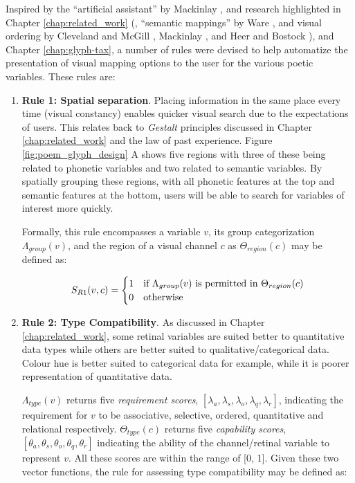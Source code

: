 Inspired by the ``artificial assistant'' by Mackinlay \etal \cite{mackinlay2007show}, and research highlighted in Chapter \ref{chap:related_work} (\eg, ``semantic mappings'' by Ware \cite{ware2010visual}, and visual ordering by Cleveland and McGill \cite{cleveland1984graphical}, Mackinlay \cite{mackinlay1986automating}, and Heer and Bostock \cite{heer2010crowdsourcing}), and Chapter \ref{chap:glyph-tax}, a number of rules were devised to help automatize the presentation of visual mapping options to the user for the various poetic variables.
These rules are:

\begin{enumerate}
\item \textbf{Rule 1: Spatial separation}. Placing information in the same place every time (visual constancy) enables quicker visual search due to the expectations of users. 
This relates back to \emph{Gestalt} principles discussed in Chapter \ref{chap:related_work} and the law of past experience. 
Figure \ref{fig:poem_glyph_design} A shows five regions with three of these being related to phonetic variables and two related to semantic variables.
By spatially grouping these regions, with all phonetic features at the top and semantic features at the bottom, users will be able to search for variables of interest more quickly.

Formally, this rule encompasses a variable $v$, its group categorization $\Lambda_{group}(v)$, and the region of a visual channel $c$ as $\Theta_{region}(c)$ may be defined as:

\[
\vspace{-1mm}
	S_{R1}(v, c) = \begin{cases}
		1 & \text{if }\Lambda_{group}(v)\text{ is permitted in } \Theta_{region}(c)\\
		0 & \text{otherwise}
	\end{cases}
\]


\item \textbf{Rule 2: Type Compatibility}. As discussed in Chapter \ref{chap:related_work}, some retinal variables are suited better to quantitative data types while others are better suited to qualitative/categorical data. 
Colour hue is better suited to categorical data for example, while it is poorer representation of quantitative data. 

$\Lambda_{type}(v)$ returns five \emph{requirement scores}, $[ \lambda_a, \lambda_s, \lambda_o, \lambda_q, \lambda_r]$, indicating the requirement for $v$ to be associative, selective, ordered, quantitative and relational respectively.
$\Theta_{type}(c)$ returns five \emph{capability scores}, $[ \theta_a, \theta_s, \theta_o, \theta_q, \theta_r]$ indicating the ability of the channel/retinal variable to represent $v$.
All these scores are within the range of [0, 1].
Given these two vector functions, the rule for assessing type compatibility may be defined as:


\end{enumerate}
